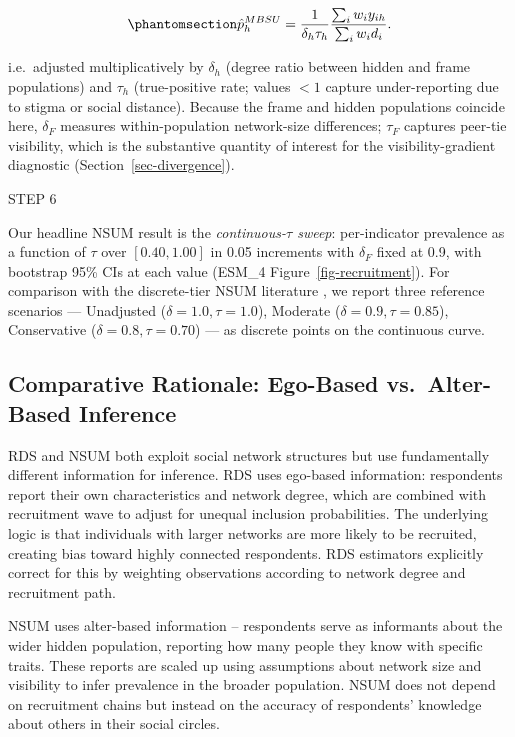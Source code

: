 \documentclass[
  12pt,
  letterpaper,
  DIV=11,
  numbers=noendperiod]{scrartcl}
\begin{document}
\begin{equation}\phantomsection\label{eq-2}{\hat p_{h}^{MBSU}  
=  
\frac{1}{\delta_h \tau_h}  
\frac{\sum_i w_i y_{ih}}{\sum_i w_i d_i}.}\end{equation}

i.e.~adjusted multiplicatively by \(\delta_h\) (degree ratio between
hidden and frame populations) and \(\tau_h\) (true-positive rate; values
\(< 1\) capture under-reporting due to stigma or social distance).
Because the frame and hidden populations coincide here, \(\delta_F\)
measures within-population network-size differences; \(\tau_F\) captures
peer-tie visibility, which is the substantive quantity of interest for
the visibility-gradient diagnostic (Section~\ref{sec-divergence}).

STEP 6

Our headline NSUM result is the \emph{continuous-\(\tau\) sweep}:
per-indicator prevalence as a function of \(\tau\) over \([0.40, 1.00]\)
in 0.05 increments with \(\delta_F\) fixed at 0.9, with bootstrap 95\%
CIs at each value (ESM\_4 Figure~\ref{fig-recruitment}). For comparison
with the discrete-tier NSUM literature
\autocite{kill98-social,malt15-estimating,feeh16-generalizing}, we
report three reference scenarios --- Unadjusted
(\(\delta = 1.0, \tau = 1.0\)), Moderate
(\(\delta = 0.9, \tau = 0.85\)), Conservative
(\(\delta = 0.8, \tau = 0.70\)) --- as discrete points on the continuous
curve.

\subsection{Comparative Rationale: Ego-Based vs.~Alter-Based
Inference}\label{sec-comparative-rationale}

RDS and NSUM both exploit social network structures but use
fundamentally different information for inference. RDS uses ego-based
information: respondents report their own characteristics and network
degree, which are combined with recruitment wave to adjust for unequal
inclusion probabilities. The underlying logic is that individuals with
larger networks are more likely to be recruited, creating bias toward
highly connected respondents. RDS estimators explicitly correct for this
by weighting observations according to network degree and recruitment
path.

NSUM uses alter-based information -- respondents serve as informants
about the wider hidden population, reporting how many people they know
with specific traits. These reports are scaled up using assumptions
about network size and visibility to infer prevalence in the broader
population. NSUM does not depend on recruitment chains but instead on
the accuracy of respondents' knowledge about others in their social
circles.
\end{document}
